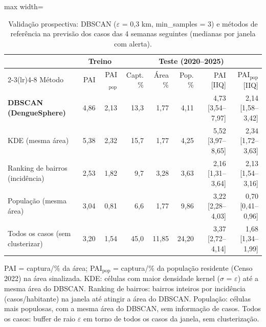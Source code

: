 \begin{table}[htbp]
\centering
\small
\caption{Validação prospectiva: DBSCAN ($\varepsilon$ = 0,3 km, min\_samples = 3) e métodos de referência na previsão dos casos das 4 semanas seguintes (medianas por janela com alerta).}
\label{tab:comparacao}
\begin{adjustbox}{max width=\linewidth}
\begin{tabular}{lrrrrrrr}
\toprule
& \multicolumn{2}{c}{Treino} & \multicolumn{5}{c}{Teste (2020--2025)} \\
\cmidrule(lr){2-3}\cmidrule(lr){4-8}
Método & PAI & PAI$_\text{pop}$ & Capt. \% & Área \% & Pop. \% & PAI [IIQ] & PAI$_\text{pop}$ [IIQ] \\
\midrule
\textbf{DBSCAN (DengueSphere)} & 4,86 & 2,13 & 13,3 & 1,77 & 4,11 & 4,73 [3,54--7,97] & 2,14 [1,58--3,42] \\
KDE (mesma área) & 5,38 & 2,32 & 15,7 & 1,77 & 4,25 & 5,52 [3,97--8,65] & 2,34 [1,72--3,63] \\
Ranking de bairros (incidência) & 2,53 & 1,82 & 9,7 & 3,28 & 3,63 & 2,16 [1,31--3,64] & 2,13 [1,54--3,16] \\
População (mesma área) & 3,04 & 0,81 & 6,6 & 1,77 & 9,86 & 3,22 [2,28--4,03] & 0,70 [0,41--0,96] \\
Todos os casos (sem clusterizar) & 3,20 & 1,54 & 45,0 & 11,85 & 24,20 & 3,37 [2,72--4,14] & 1,68 [1,34--1,99] \\
\bottomrule
\end{tabular}
\end{adjustbox}
\par\smallskip\begin{minipage}{0.95\linewidth}\footnotesize PAI = captura/\% da área; PAI$_\text{pop}$ = captura/\% da população residente (Censo 2022) na área sinalizada. KDE: células com maior densidade kernel ($\sigma$ = $\varepsilon$) até a mesma área do DBSCAN. Ranking de bairros: bairros inteiros por incidência (casos/habitante) na janela até atingir a área do DBSCAN. População: células mais populosas, com a mesma área do DBSCAN, sem informação de casos. Todos os casos: buffer de raio $\varepsilon$ em torno de todos os casos da janela, sem clusterização.\end{minipage}
\end{table}
